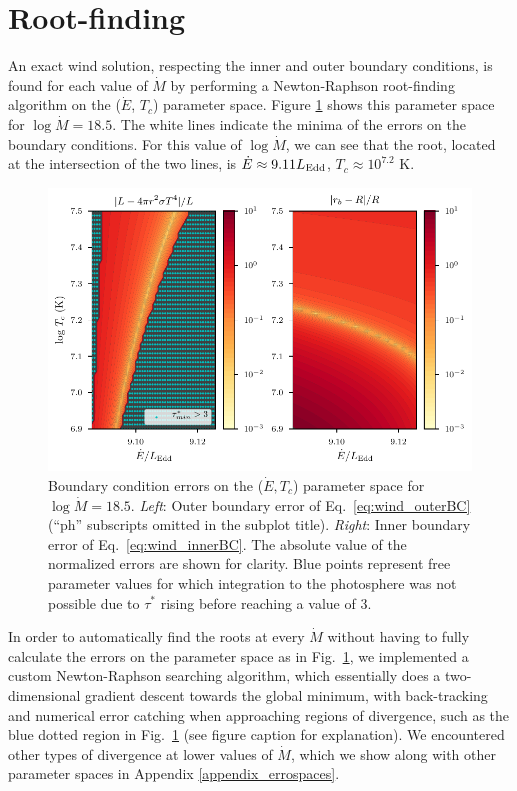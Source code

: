 \documentclass[../main.tex]{subfiles}
\begin{document}
\section{Root-finding}\label{section:wind_rootfinding}
An exact wind solution, respecting the inner and outer boundary conditions, is found for each value of $\dot{M}$ by performing a Newton-Raphson root-finding algorithm on the ($\dot{E}$, $T_c$) parameter space. Figure \ref{fig:errorspace_18_5} shows this parameter space for $\log\dot{M}=18.5$. The white lines indicate the minima of the errors on the boundary conditions. For this value of $\log\dot{M}$, we can see that the root, located at the intersection of the two lines, is $\dot{E}\approx 9.11L_\text{Edd}$, $T_c\approx 10
^{7.2}$ K.  

\begin{figure}[htb!]
    \centering
    \includegraphics[width=\textwidth]{figures/errorspace_18_5.pdf}
    \caption[B.C. errors on the $\log\dot{M}=18.5$ wind parameter space]{Boundary condition errors on the ($\dot{E},T_c$) parameter space for $\log\dot{M}=18.5$. \textit{Left}: Outer boundary error of Eq.~\eqref{eq:wind_outerBC} (``ph'' subscripts omitted in the subplot title). \textit{Right}: Inner boundary error of Eq.~\eqref{eq:wind_innerBC}. The absolute value of the normalized errors are shown for clarity. Blue points represent free parameter values for which integration to the photosphere was not possible due to $\tau^*$ rising before reaching a value of 3.}
    \label{fig:errorspace_18_5}
\end{figure}

In order to automatically find the roots at every $\dot{M}$ without having to fully calculate the errors on the parameter space as in Fig.~\ref{fig:errorspace_18_5}, we implemented a custom Newton-Raphson searching algorithm, which essentially does a two-dimensional gradient descent towards the global minimum, with back-tracking and numerical error catching when approaching regions of divergence, such as the blue dotted region in Fig.~\ref{fig:errorspace_18_5} (see figure caption for explanation). We encountered other types of divergence at lower values of $\dot{M}$, which we show along with other parameter spaces in Appendix \ref{appendix_errospaces}. 
\end{document}
